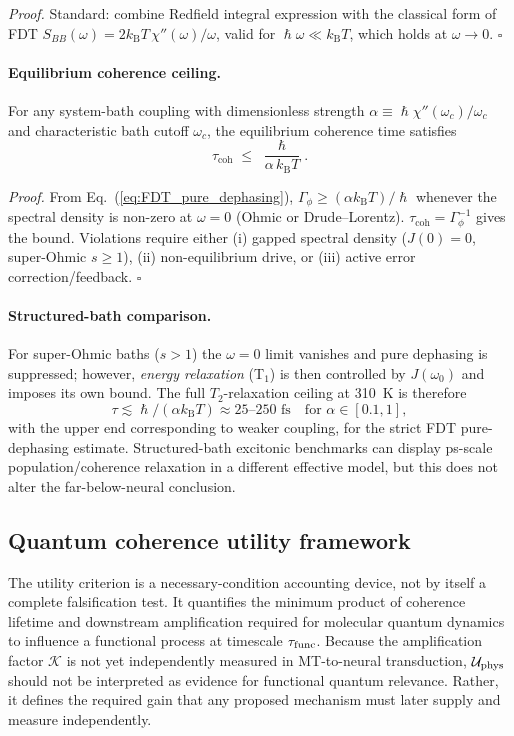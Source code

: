 \documentclass[twocolumn,10pt]{article}
\renewcommand{\hbar}{\hslash}
\newcommand{\kB}{k_{\text{B}}}
\newcommand{\fs}{\text{~fs}}
\begin{document}
\textit{Proof.} Standard: combine Redfield integral expression
\cite{BreuerPetruccione2002} with the classical form of FDT
$S_{BB}(\omega)=2\kB T\,\chi''(\omega)/\omega$, valid for
$\hbar\omega\ll\kB T$, which holds at $\omega\to 0$. \hfill$\square$
\paragraph{Equilibrium coherence ceiling.}
\label{cor:ceiling}
For any system-bath coupling with dimensionless strength
$\alpha\equiv \hbar\chi''(\omega_c)/\omega_c$ and characteristic bath
cutoff $\omega_c$, the equilibrium coherence time satisfies
\begin{equation}
\tau_{\text{coh}} \;\le\; \frac{\hbar}{\alpha\,\kB T}.
\label{eq:coh_bound}
\end{equation}

\textit{Proof.} From Eq.~(\ref{eq:FDT_pure_dephasing}), $\Gamma_\phi
\ge (\alpha\kB T)/\hbar$ whenever the spectral density is non-zero at
$\omega=0$ (Ohmic or Drude--Lorentz). $\tau_{\text{coh}}=\Gamma_\phi^{-1}$
gives the bound. Violations require either (i) gapped spectral density
($J(0)=0$, super-Ohmic $s\ge 1$), (ii) non-equilibrium drive, or (iii)
active error correction/feedback. \hfill$\square$
\paragraph{Structured-bath comparison.}
For super-Ohmic baths ($s>1$) the $\omega=0$ limit vanishes and pure
dephasing is suppressed; however, \emph{energy relaxation} (T$_1$) is then
controlled by $J(\omega_0)$ and imposes its own bound. The full \(T_2\)-relaxation ceiling at 310~K is therefore
\[
\tau\lesssim\hbar/(\alpha\kB T)\approx 25\text{--}250\fs
\quad \text{for } \alpha\in[0.1,1],
\]
with the upper end corresponding to weaker coupling, for the strict FDT pure-dephasing estimate. Structured-bath excitonic
benchmarks can display ps-scale population/coherence relaxation in a
different effective model, but this does not alter the far-below-neural
conclusion.


\subsection{Quantum coherence utility framework}
\label{sec:utility}
The utility criterion is a necessary-condition accounting device, not by
itself a complete falsification test. It quantifies the minimum product of
coherence lifetime and downstream amplification required for molecular
quantum dynamics to influence a functional process at timescale
$\tau_{\rm func}$. Because the amplification factor $\mathcal{K}$ is not yet
independently measured in MT-to-neural transduction, $\mathcal{U}_{\rm phys}$
should not be interpreted as evidence for functional quantum relevance.
Rather, it defines the required gain that any proposed mechanism must later
supply and measure independently.
\end{document}
